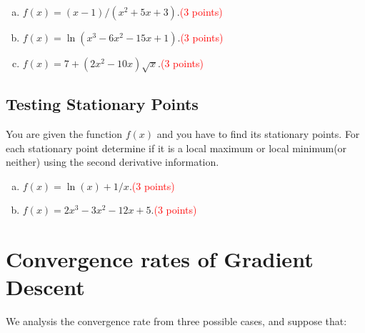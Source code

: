 \documentclass[11pt, a4paper]{article}
\begin{document}
\begin{enumerate}[(a)]
\item $f(x) = (x-1)/(x^2+5x+3)$.\textcolor{red}{(3 points)}

\item $f(x) = \ln(x^3-6x^2-15x+1)$.\textcolor{red}{(3 points)}

\item $f(x) = 7+(2x^2-10x)\sqrt{x}$.\textcolor{red}{(3 points)}
\end{enumerate}

\subsection{Testing Stationary Points}
You are given the function $f(x)$ and you have to find its stationary points. For each stationary point determine if it is a local maximum or local minimum(or neither) using the second derivative information.

\begin{enumerate}[(a)]
\item $f(x) = \ln(x)+1/x$.\textcolor{red}{(3 points)}

\item $f(x) = 2x^3-3x^2-12x+5$.\textcolor{red}{(3 points)}

\end{enumerate}

\section{Convergence rates of Gradient Descent }
We analysis the convergence rate from three possible cases, and suppose that:
\end{document}
